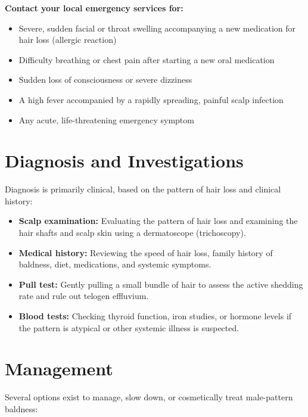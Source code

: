 \textbf{Contact your local emergency services for:}
\begin{itemize}
    \item Severe, sudden facial or throat swelling accompanying a new medication for hair loss (allergic reaction)
    \item Difficulty breathing or chest pain after starting a new oral medication
    \item Sudden loss of consciousness or severe dizziness
    \item A high fever accompanied by a rapidly spreading, painful scalp infection
    \item Any acute, life-threatening emergency symptom
\end{itemize}

\section*{Diagnosis and Investigations}
Diagnosis is primarily clinical, based on the pattern of hair loss and clinical history:

\begin{itemize}
    \item \textbf{Scalp examination:} Evaluating the pattern of hair loss and examining the hair shafts and scalp skin using a dermatoscope (trichoscopy).
    \item \textbf{Medical history:} Reviewing the speed of hair loss, family history of baldness, diet, medications, and systemic symptoms.
    \item \textbf{Pull test:} Gently pulling a small bundle of hair to assess the active shedding rate and rule out telogen effluvium.
    \item \textbf{Blood tests:} Checking thyroid function, iron studies, or hormone levels if the pattern is atypical or other systemic illness is suspected.
\end{itemize}

\section*{Management}
Several options exist to manage, slow down, or cosmetically treat male-pattern baldness:

